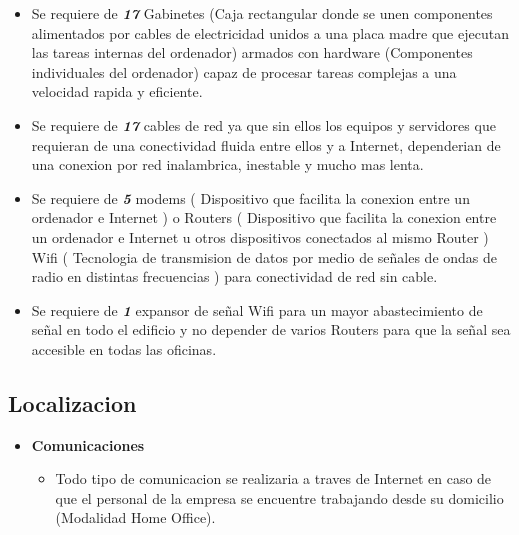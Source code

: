 \documentclass[
10pt, %
a4paper, %
oneside, %
headinclude,footinclude, %
BCOR5mm, %
]{scrartcl}
\begin{document}
\begin{itemize}
\begin{itemize}
      \item Se requiere de \emph { \textbf{17} } Gabinetes (Caja rectangular
              donde se unen componentes alimentados por cables de electricidad
              unidos a una placa madre que ejecutan las tareas internas del
              ordenador) armados con hardware (Componentes individuales del
              ordenador) capaz de procesar tareas complejas a una velocidad
              rapida y eficiente.
    \item Se requiere de \emph { \textbf{17} } cables de red ya que sin ellos
            los equipos y servidores que requieran de una conectividad
            fluida entre ellos y a Internet, dependerian de una conexion por
            red inalambrica, inestable y mucho mas lenta.
    \item Se requiere de \emph { \textbf{5} } modems ( Dispositivo
            que facilita la conexion entre un ordenador e Internet ) o
            Routers ( Dispositivo que facilita la conexion entre un
            ordenador e Internet u otros dispositivos conectados al mismo
            Router ) Wifi ( Tecnologia de transmision de datos por medio de
            señales de ondas de radio en distintas frecuencias ) para
            conectividad de red sin cable.
    \item Se requiere de \emph { \textbf{1} } expansor de señal Wifi
            para un mayor abastecimiento de señal en todo el edificio y
            no depender de varios Routers para que la señal sea accesible en
            todas las oficinas.
  \end{itemize}
\end{itemize}

\subsection{Localizacion}
\begin{itemize}
  \item \textbf {Comunicaciones}
  \begin{itemize}
    \item Todo tipo de comunicacion se realizaria a traves de Internet en caso
            de que el personal de la empresa se encuentre trabajando desde su
            domicilio (Modalidad Home Office).
  \end{itemize}
\end{itemize}
\end{document}
